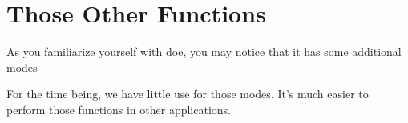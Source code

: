 \section{Those Other Functions}

As you familiarize yourself with \gls{doe}, you may notice that it has some additional modes {}

For the time being, we have little use for those modes. It's much easier to perform those functions in other applications.

